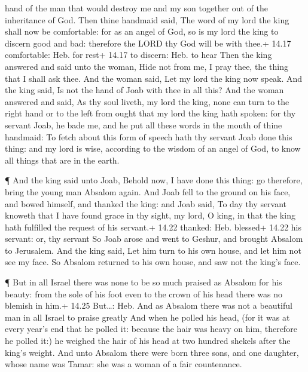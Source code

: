 hand of the man that would destroy me and my son together out of the
inheritance of God.  Then thine handmaid said, The word of
my lord the king shall now be comfortable: for as an angel of God, so is
my lord the king to discern good and bad: therefore the LORD thy God
will be with thee.+ 14.17 comfortable: Heb. for rest+ 14.17 to discern:
Heb. to hear  Then the king answered and said unto the
woman, Hide not from me, I pray thee, the thing that I shall ask thee.
And the woman said, Let my lord the king now speak.  And
the king said, Is not the hand of Joab with thee in all this? And the
woman answered and said, As thy soul liveth, my lord the king, none can
turn to the right hand or to the left from ought that my lord the king
hath spoken: for thy servant Joab, he bade me, and he put all these
words in the mouth of thine handmaid:  To fetch about this
form of speech hath thy servant Joab done this thing: and my lord is
wise, according to the wisdom of an angel of God, to know all things
that are in the earth.

 ¶ And the king said unto Joab, Behold now, I have done
this thing: go therefore, bring the young man Absalom again.
 And Joab fell to the ground on his face, and bowed
himself, and thanked the king: and Joab said, To day thy servant knoweth
that I have found grace in thy sight, my lord, O king, in that the king
hath fulfilled the request of his servant.+ 14.22 thanked: Heb. blessed+
14.22 his servant: or, thy servant  So Joab arose and went
to Geshur, and brought Absalom to Jerusalem.  And the king
said, Let him turn to his own house, and let him not see my face. So
Absalom returned to his own house, and saw not the king's face.

 ¶ But in all Israel there was none to be so much praised
as Absalom for his beauty: from the sole of his foot even to the crown
of his head there was no blemish in him.+ 14.25 But\ldots: Heb. And as
Absalom there was not a beautiful man in all Israel to praise greatly
 And when he polled his head, (for it was at every year's
end that he polled it: because the hair was heavy on him, therefore he
polled it:) he weighed the hair of his head at two hundred shekels after
the king's weight.  And unto Absalom there were born three
sons, and one daughter, whose name was Tamar: she was a woman of a fair
countenance.

